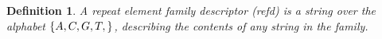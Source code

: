 \documentclass{article}
\newtheorem{definition}{Definition}
\begin{document}
\begin{definition} A repeat element family descriptor (refd) is a
  string over the alphabet $\{A,C,G,T,\*\}$, describing the contents
  of any string in the family.
\end{definition}
\end{document}

